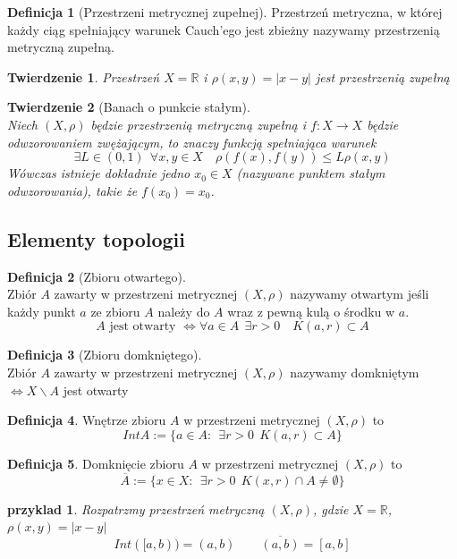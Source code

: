 \documentclass[12pt,a4paper]{article}
\newtheorem{tw}{Twierdzenie}
\newtheorem{przyklad}{przyklad}
\theoremstyle{definition}
\newtheorem{df}{Definicja}
\begin{document}
\begin{df}[Przestrzeni metrycznej zupełnej]
Przestrzeń metryczna, w której każdy ciąg spełniający warunek Cauch'ego jest zbieżny nazywamy przestrzenią metryczną zupełną.
\end{df}

\begin{tw}
Przestrzeń $X = \mathbb{R}$ i $\rho (x,y) = |x-y|$ jest przestrzenią zupełną
\end{tw}

\begin{tw}[Banach o punkcie stałym]~\\
Niech $(X, \rho)$ będzie przestrzenią metryczną zupełną i $f: X \to X$ będzie odwzorowaniem zwężającym, to znaczy funkcją spełniająca warunek
$$ \exists L\in (0,1) ~~ \forall x,y\in X \quad \rho (f(x), f(y)) \leqslant L\rho (x, y) $$
Wówczas istnieje dokładnie jedno $x_0 \in X$ (nazywane punktem stałym odwzorowania), takie że $f(x_0) = x_0$. 
\end{tw}


\subsection{Elementy topologii}
\begin{df}[Zbioru otwartego]~\\
Zbiór $A$ zawarty w przestrzeni metrycznej $(X, \rho)$ nazywamy otwartym jeśli każdy punkt $a$ ze zbioru $A$ należy do $A$ wraz z pewną kulą o środku w $a$.\\
$$A \text{ jest otwarty } \Leftrightarrow \forall a\in A ~~ \exists r>0 \quad K(a, r) \subset A$$
\end{df}
\begin{df}[Zbioru domkniętego]~\\
Zbiór $A$ zawarty w przestrzeni metrycznej $(X, \rho)$ nazywamy domkniętym $ \Leftrightarrow X \smallsetminus A$ jest otwarty
\end{df}

\begin{df}
Wnętrze zbioru $A$ w przestrzeni metrycznej $(X, \rho)$ to 
$$ IntA := \{a\in A: ~~ \exists r>0 ~~ K(a,r) \subset A \} $$
\end{df}
\begin{df}
Domknięcie zbioru $A$ w przestrzeni metrycznej $(X, \rho)$ to 
$$ \overline{A} := \{x\in X: ~~ \exists r>0 ~~ K(x,r) \cap A \neq \emptyset \} $$
\end{df}

\begin{przyklad}
Rozpatrzmy przestrzeń metryczną $(X, \rho)$, gdzie $X = \mathbb{R}$, $\rho (x,y) = |x-y|$\\
$$Int([a,b)) = (a,b) \quad\quad \overline{(a,b)} = [a,b]$$
\end{przyklad}
\end{document}
